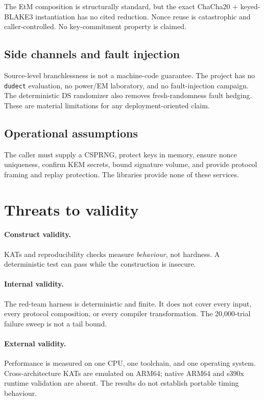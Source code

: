 \documentclass[runningheads]{llncs}
\begin{document}
The EtM composition is structurally standard, but the exact
ChaCha20 + keyed-BLAKE3 instantiation has no cited reduction.  Nonce
reuse is catastrophic and caller-controlled.  No key-commitment property
is claimed.

\subsection{Side channels and fault injection}

Source-level branchlessness is not a machine-code guarantee.  The
project has no \texttt{dudect} evaluation, no power/EM laboratory, and
no fault-injection campaign.  The deterministic DS randomizer also
removes fresh-randomness fault hedging.  These are material limitations
for any deployment-oriented claim.

\subsection{Operational assumptions}

The caller must supply a CSPRNG, protect keys in memory, ensure nonce
uniqueness, confirm KEM secrets, bound signature volume, and provide
protocol framing and replay protection.  The libraries provide none of
these services.

\section{Threats to validity}
\label{sec:validity}

\paragraph{Construct validity.}  KATs and reproducibility checks measure
\emph{behaviour}, not hardness.  A deterministic test can pass while the
construction is insecure.

\paragraph{Internal validity.}  The red-team harness is deterministic and
finite.  It does not cover every input, every protocol composition, or
every compiler transformation.  The 20,000-trial failure sweep is not a
tail bound.

\paragraph{External validity.}  Performance is measured on one CPU,
one toolchain, and one operating system.  Cross-architecture KATs are
emulated on ARM64; native ARM64 and s390x runtime validation are absent.
The results do not establish portable timing behaviour.
\end{document}
